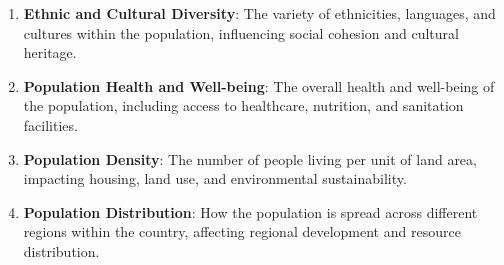 \begin{enumerate}
  \item \textbf{Ethnic and Cultural Diversity}: The variety of
  ethnicities, languages, and cultures within the population,
  influencing social cohesion and cultural heritage.
  
  \item \textbf{Population Health and Well-being}: The overall
  health and well-being of the population, including access to
  healthcare, nutrition, and sanitation facilities.
  
  \item \textbf{Population Density}: The number of people living
  per unit of land area, impacting housing, land use, and
  environmental sustainability.
  
  \item \textbf{Population Distribution}: How the population is
  spread across different regions within the country, affecting
  regional development and resource distribution.
\end{enumerate}
